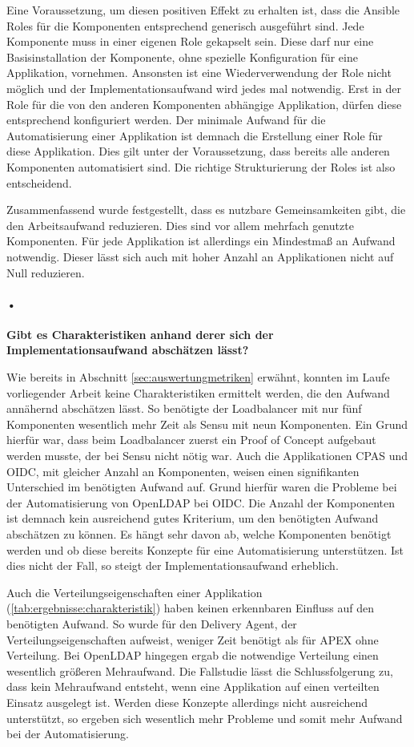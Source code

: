 Eine Voraussetzung, um diesen positiven Effekt zu erhalten ist, dass die Ansible Roles für die Komponenten entsprechend generisch ausgeführt sind. Jede Komponente muss in einer eigenen Role gekapselt sein. Diese darf nur eine Basisinstallation der Komponente, ohne spezielle Konfiguration für eine Applikation, vornehmen. Ansonsten ist eine Wiederverwendung der Role nicht möglich und der Implementationsaufwand wird jedes mal notwendig. 
Erst in der Role für die von den anderen Komponenten abhängige Applikation, dürfen diese entsprechend konfiguriert werden. Der minimale Aufwand für die Automatisierung einer Applikation ist demnach die Erstellung einer Role für diese Applikation. Dies gilt unter der Voraussetzung, dass bereits alle anderen Komponenten automatisiert sind. Die richtige Strukturierung der Roles ist also entscheidend. 

Zusammenfassend wurde festgestellt, dass es nutzbare Gemeinsamkeiten gibt, die den Arbeitsaufwand reduzieren. Dies sind vor allem mehrfach genutzte Komponenten. Für jede Applikation ist allerdings ein Mindestmaß an Aufwand notwendig. Dieser lässt sich auch mit hoher Anzahl an Applikationen nicht auf Null reduzieren.

\paragraph{•}
\textbf{Gibt es Charakteristiken anhand derer sich der Implementationsaufwand abschätzen lässt?}

Wie bereits in Abschnitt \ref{sec:auswertungmetriken} erwähnt, konnten im Laufe vorliegender Arbeit keine Charakteristiken ermittelt werden, die den Aufwand annähernd abschätzen lässt. So benötigte der Loadbalancer mit nur fünf Komponenten wesentlich mehr Zeit als Sensu mit neun Komponenten. Ein Grund hierfür war, dass beim Loadbalancer zuerst ein Proof of Concept aufgebaut werden musste, der bei Sensu nicht nötig war. Auch die Applikationen CPAS und OIDC, mit gleicher Anzahl an Komponenten, weisen einen signifikanten Unterschied im benötigten Aufwand auf. Grund hierfür waren die Probleme bei der Automatisierung von OpenLDAP bei OIDC. Die Anzahl der Komponenten ist demnach kein ausreichend gutes Kriterium, um den benötigten Aufwand abschätzen zu können. Es hängt sehr davon ab, welche Komponenten benötigt werden und ob diese bereits Konzepte für eine Automatisierung unterstützen. Ist dies nicht der Fall, so steigt der Implementationsaufwand erheblich.

Auch die Verteilungseigenschaften einer Applikation (\autoref{tab:ergebnisse:charakteristik}) haben keinen erkennbaren Einfluss auf den benötigten Aufwand. So wurde für den Delivery Agent, der Verteilungseigenschaften aufweist, weniger Zeit benötigt als für APEX ohne Verteilung. Bei OpenLDAP hingegen ergab die notwendige Verteilung einen wesentlich größeren Mehraufwand. Die Fallstudie lässt die Schlussfolgerung zu, dass kein Mehraufwand entsteht, wenn eine Applikation auf einen verteilten Einsatz ausgelegt ist. Werden diese Konzepte allerdings nicht ausreichend unterstützt, so ergeben sich wesentlich mehr Probleme und somit mehr Aufwand bei der Automatisierung.

